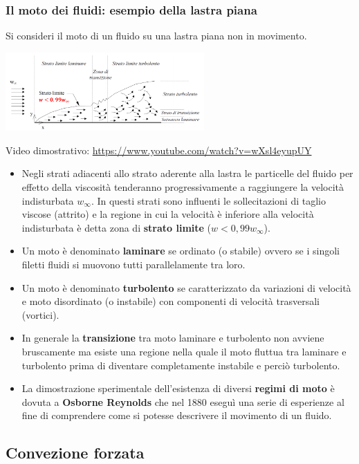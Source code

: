 \subsubsection{Il moto dei fluidi: esempio della lastra piana}
Si consideri il moto di un fluido su una lastra piana non in movimento.
\begin{center}
    \includegraphics[height=3cm]{../L11/img1.PNG}
\end{center}
Video dimostrativo: \url{https://www.youtube.com/watch?v=wXsl4eyupUY}\newline
\newline
\begin{itemize}
    \item Negli strati adiacenti allo strato aderente alla lastra le particelle del fluido per
    effetto della viscosità tenderanno progressivamente a raggiungere la velocità
    indisturbata $w_{\infty}$. In questi strati sono influenti le sollecitazioni di taglio viscose
    (attrito) e la regione in cui la velocità è inferiore alla velocità indisturbata è
    detta zona di \textbf{strato limite} ($w < 0,99 w_{\infty}$).
    \item Un moto è denominato \textbf{laminare} se ordinato (o stabile) ovvero se i singoli filetti fluidi si muovono tutti parallelamente tra loro.
    \item Un moto è denominato \textbf{turbolento} se caratterizzato da variazioni di velocità e moto disordinato (o instabile) con componenti di velocità trasversali (vortici).
    \item In generale la \textbf{transizione} tra moto laminare e turbolento non avviene bruscamente ma esiste una regione nella quale il moto fluttua tra laminare e turbolento prima di diventare completamente instabile e perciò turbolento.
    \item La dimostrazione sperimentale dell'esistenza di diversi \textbf{regimi di moto} è dovuta a \textbf{Osborne Reynolds} che nel 1880 eseguì una serie di esperienze al fine di comprendere come si potesse descrivere il movimento di un fluido.
\end{itemize}
\subsection{Convezione forzata}
